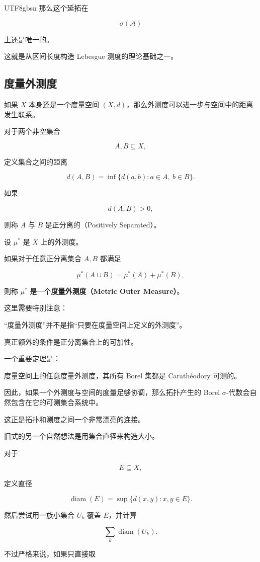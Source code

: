 \documentclass[11pt]{article}
\begin{document}
\begin{CJK*}{UTF8}{gbsn}
那么这个延拓在

\[
\sigma(\mathcal{A})
\]

上还是唯一的。

这就是从区间长度构造 Lebesgue 测度的理论基础之一。

\subsection{度量外测度}

如果 $X$ 本身还是一个度量空间 $(X,d)$，那么外测度可以进一步与空间中的距离发生联系。

对于两个非空集合

\[
A,B\subseteq X,
\]

定义集合之间的距离

\[
d(A,B)=\inf\{d(a,b):a\in A,\ b\in B\}.
\]

如果

\[
d(A,B)>0,
\]

则称 $A$ 与 $B$ 是正分离的（Positively Separated）。

设 $\mu^{*}$ 是 $X$ 上的外测度。

如果对于任意正分离集合 $A,B$ 都满足

\[
\mu^{*}(A\cup B)=\mu^{*}(A)+\mu^{*}(B),
\]

则称 $\mu^{*}$ 是一个\textbf{度量外测度（Metric Outer Measure）}。

这里需要特别注意：

“度量外测度”并不是指“只要在度量空间上定义的外测度”。

真正额外的条件是正分离集合上的可加性。

一个重要定理是：

度量空间上的任意度量外测度，其所有 Borel 集都是 Carathéodory 可测的。

因此，如果一个外测度与空间的度量足够协调，那么拓扑产生的 Borel $\sigma$-代数会自然包含在它的可测集合系统中。

这正是拓扑和测度之间一个非常漂亮的连接。

旧式的另一个自然想法是用集合直径来构造大小。

对于

\[
E\subseteq X,
\]

定义直径

\[
\operatorname{diam}(E)=\sup\{d(x,y):x,y\in E\}.
\]

然后尝试用一族小集合 $U_{k}$ 覆盖 $E$，并计算

\[
\sum_{k}\operatorname{diam}(U_{k}).
\]

不过严格来说，如果只直接取


\end{CJK*}
\end{document}
